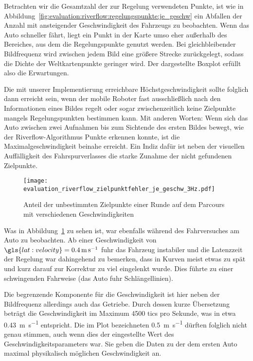 Betrachten wir die Gesamtzahl der zur Regelung verwendeten Punkte, ist wie in 
Abbildung~\ref{fig:evaluation:riverflow:regelungspunkte:je_geschw} ein Abfallen der Anzahl mit ansteigender Geschwindigkeit des Fahrzeugs zu beobachten. Wenn das Auto schneller fährt, liegt ein Punkt in der Karte umso eher außerhalb des Bereiches, aus dem die Regelungspunkte genutzt werden. Bei gleichbleibender Bildfrequenz wird zwischen jedem Bild eine größere Strecke zurückgelegt, sodass die Dichte der Weltkartenpunkte geringer wird. Der dargestellte Boxplot erfüllt also die Erwartungen.

Die mit unserer Implementierung erreichbare Höchstgeschwindigkeit sollte folglich dann erreicht sein, wenn der mobile Roboter fast ausschließlich nach den Informationen eines Bildes regelt oder sogar zwischenzeitlich keine Zielpunkte mangels Regelungspunkten bestimmen kann. Mit anderen Worten: Wenn sich das Auto zwischen zwei Aufnahmen bis zum Sichtende des ersten Bildes bewegt, wie der Riverflow-Algorithmus Punkte erkennen konnte, ist die Maximalgeschwindigkeit beinahe erreicht. Ein Indiz dafür ist neben der visuellen Auffälligkeit des Fahrspurverlasses die starke Zunahme der nicht gefundenen Zielpunkte. 

\begin{figure}[htbp] %
	\centering
	\texttt{[image: evaluation\_riverflow\_zielpunktfehler\_je\_geschw\_3Hz.pdf]}
	\caption{Anteil der unbestimmten Zielpunkte einer Runde auf dem Parcours mit verschiedenen Geschwindigkeiten}
	\label{fig:evaluation:riverflow:zielpunktfehler_je_geschw}
\end{figure}

Was in Abbildung~\ref{fig:evaluation:riverflow:zielpunktfehler_je_geschw} zu sehen ist, war ebenfalls während des Fahrversuches am Auto zu beobachten. Ab einer Geschwindigkeit von \( \gls{lat:velocity} = \SI{0,4}{\metre\per\second} \) fuhr das Fahrzeug instabiler und die Latenzzeit der Regelung war dahingehend zu bemerken, dass in Kurven meist etwas zu spät und kurz darauf zur Korrektur zu viel eingelenkt wurde. Dies führte zu einer schwingenden Fahrweise (das Auto fuhr \glqq Schlängellinien\grqq). 

Die begrenzende Komponente für die Geschwindigkeit ist hier neben der Bildfrequenz allerdings auch das Getriebe. Durch dessen kurze Übersetzung beträgt die Geschwindigkeit im Maximum 4500 tics pro Sekunde, was in etwa \SI{0,43}{\metre\per\second} entspricht. Die im Plot bezeichneten \SI{0,5}{\metre\per\second} dürften folglich nicht genau stimmen, auch wenn dies der eingestellte Wert des Geschwindigkeitsparameters war. Sie geben die Daten zu der dem ersten Auto maximal physikalisch möglichen Geschwindigkeit an. 


